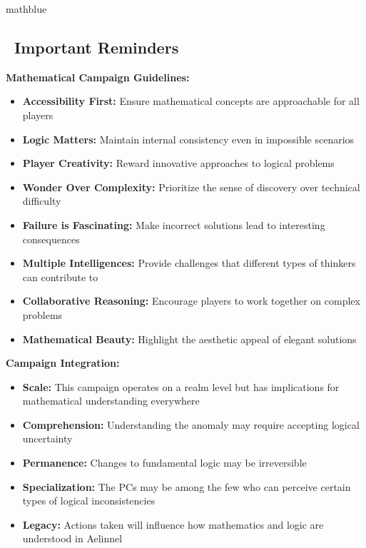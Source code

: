\documentclass[11pt]{article}
\begin{document}
\begin{campaignsection}{mathblue}
\subsection*{\faExclamationTriangle\ Important Reminders}

\textbf{Mathematical Campaign Guidelines:}
\begin{itemize}
    \item \textbf{Accessibility First:} Ensure mathematical concepts are approachable for all players
    \item \textbf{Logic Matters:} Maintain internal consistency even in impossible scenarios
    \item \textbf{Player Creativity:} Reward innovative approaches to logical problems
    \item \textbf{Wonder Over Complexity:} Prioritize the sense of discovery over technical difficulty
    \item \textbf{Failure is Fascinating:} Make incorrect solutions lead to interesting consequences
    \item \textbf{Multiple Intelligences:} Provide challenges that different types of thinkers can contribute to
    \item \textbf{Collaborative Reasoning:} Encourage players to work together on complex problems
    \item \textbf{Mathematical Beauty:} Highlight the aesthetic appeal of elegant solutions
\end{itemize}

\textbf{Campaign Integration:}
\begin{itemize}
    \item \textbf{Scale:} This campaign operates on a realm level but has implications for mathematical understanding everywhere
    \item \textbf{Comprehension:} Understanding the anomaly may require accepting logical uncertainty
    \item \textbf{Permanence:} Changes to fundamental logic may be irreversible
    \item \textbf{Specialization:} The PCs may be among the few who can perceive certain types of logical inconsistencies
    \item \textbf{Legacy:} Actions taken will influence how mathematics and logic are understood in Aelinnel
\end{itemize}


\end{campaignsection}
\end{document}
